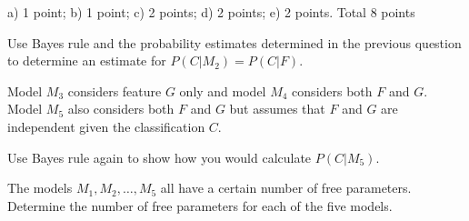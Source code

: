 \documentclass[a4paper]{article}
\newcommand{\tjboxed}[1]{}
\begin{document}
\begin{exam}
\begin{vraag}{a) 1 point; b) 1 point; c) 2 points; d) 2 points; e) 2 points. Total 8 points}
\begin{deelvraag}
  Use Bayes rule and the probability estimates determined in the previous question
  to determine an estimate for $P(C|M_2)=P(C|F)$.
  \tjboxed{%
    \begin{alignat*}{2}
    \text{Bayes} && \qquad P(C=1|F) &= \frac{P(C=1)P(F|C=1)}{P(F)}, \\
    \text{where} && \qquad P(F) &= P(C=0)P(F|C=0)+P(C=1)P(F|C=1). \\
    \text{We get} && \qquad P(C=1|F=0) &= \frac{53}{86} = 0.6163 \\
    \text{and} && \qquad P(C=1|F=1) &= \frac{143}{161} = 0.8882.
    \end{alignat*}
  }
\end{deelvraag}
Model $M_3$ considers feature $G$ only and model $M_4$ considers both $F$ and $G$. Model $M_5$ also considers both $F$ and $G$ but assumes that $F$ and $G$ are independent given the classification $C$.
\begin{deelvraag}
  Use Bayes rule again to show how you would calculate $P(C|M_5)$.
  \tjboxed{%
    \begin{alignat*}{2}
    \text{Bayes} && \qquad P(C=1|M_5) &= \frac{P(C=1)P(F|C=1)P(G|C=1)}{P(F,G)}, \\
    \text{where} && \qquad P(F,G) &= P(C=0)P(F|C=0)P(G|C=0)+\\
                 && \qquad        &\quad + P(C=1)P(F|C=1)P(G|C=1). \\
    \text{We get} && \qquad P(C=1|F=0,G=0) &= \frac{92803}{142391} = 0.6517 \\
                  && \qquad P(C=1|F=0,G=1) &= \frac{83793}{144161} = 0.5812 \\
                  && \qquad P(C=1|F=1,G=0) &= \frac{250393}{277441} = 0.9025 \\
    \text{and}    && \qquad P(C=1|F=1,G=1) &= \frac{75361}{86337} = 0.8729.
    \end{alignat*}
  }
\end{deelvraag}
\begin{deelvraag}
  The models $M_1, M_2,\ldots,M_5$ all have a certain number of free parameters.
  Determine the number of free parameters for each of the five models.
  \tjboxed{%
    Model 1: No features so we consider the joint probability $P\{C\}$ only.
Thus we have one free parameter, for instance $P\{C=1\}$.
\newline
Answer: 1 free parameter
\\[\baselineskip]
Model 2: The joint probability is $P\{C,F\} = P\{C\}P\{F|C\}$.
The free parameters are $P\{C=1\}$, 
}
\end{deelvraag}
\end{vraag}
\end{exam}
\end{document}
